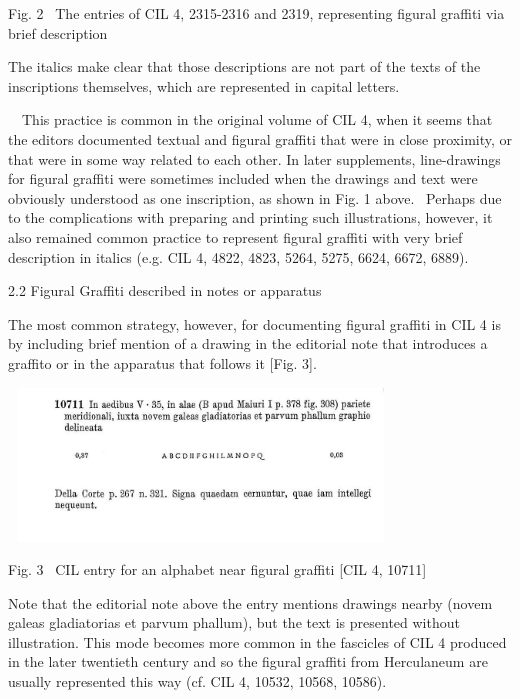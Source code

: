 \documentclass[amsthm,ebook]{saparticle}
\begin{document}
Fig. 2 \ The entries of CIL 4, 2315-2316 and 2319, representing figural graffiti via brief description


\bigskip

The italics make clear that those descriptions are not part of the texts of the inscriptions themselves, which are
represented in capital letters.


\bigskip

\ \ This practice is common in the original volume of CIL 4, when it seems that the editors documented textual and
figural graffiti that were in close proximity, or that were in some way related to each other. In later supplements,
line-drawings for figural graffiti were sometimes included when the drawings and text were obviously understood as one
inscription, as shown in Fig. 1 above. \ Perhaps due to the complications with preparing and printing such
illustrations, however, it also remained common practice to represent figural graffiti with very brief description in
italics (e.g. CIL 4, 4822, 4823, 5264, 5275, 6624, 6672, 6889). 


\bigskip

2.2 Figural Graffiti described in notes or apparatus

The most common strategy, however, for documenting figural graffiti in CIL 4 is by including brief mention of a drawing
in the editorial note that introduces a graffito or in the apparatus that follows it [Fig. 3]. \ \ 


\bigskip

 \includegraphics[width=10.227cm,height=4.075cm]{EAGLE2016BenefielSypniewski-img003.jpg} 

Fig. 3 \ CIL entry for an alphabet near figural graffiti [CIL 4, 10711]\newline


Note that the editorial note above the entry mentions drawings nearby (novem galeas gladiatorias et parvum phallum), but
the text is presented without illustration. This mode becomes more common in the fascicles of CIL 4 produced in the
later twentieth century and so the figural graffiti from Herculaneum are usually represented this way (cf. CIL 4,
10532, 10568, 10586). 
\end{document}
